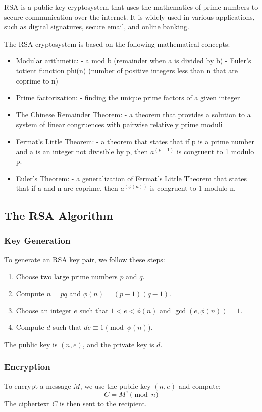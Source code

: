\documentclass[12pt,openany]{book}
\theoremstyle{definition}
\begin{document}
	RSA is a public-key cryptosystem that uses the mathematics of prime numbers to secure communication over the internet. It is widely used in various applications, such as digital signatures, secure email, and online banking.
	
	The RSA cryptosystem is based on the following mathematical concepts:
	
	
	\begin{itemize}
		\item Modular arithmetic:
		- a mod b (remainder when a is divided by b)
		- Euler's totient function phi(n) (number of positive integers less than n that are coprime to n)
		\item Prime factorization:
		- finding the unique prime factors of a given integer
		\item The Chinese Remainder Theorem:
		- a theorem that provides a solution to a system of linear congruences with pairwise relatively prime moduli
		\item Fermat's Little Theorem:
		- a theorem that states that if p is a prime number and a is an integer not divisible by p, then $a^{(p-1)}$ is congruent to 1 modulo p.
		\item Euler's Theorem:
		- a generalization of Fermat's Little Theorem that states that if a and n are coprime, then $a^{(\phi(n))}$ is congruent to 1 modulo n.
	\end{itemize}
	
	\subsection{The RSA Algorithm}
	
	\subsubsection{Key Generation}
	To generate an RSA key pair, we follow these steps:
	\begin{enumerate}
		\item Choose two large prime numbers $p$ and $q$.
		\item Compute $n = pq$ and $\phi(n) = (p-1)(q-1)$.
		\item Choose an integer $e$ such that $1 < e < \phi(n)$ and $\gcd(e, \phi(n)) = 1$.
		\item Compute $d$ such that $de \equiv 1 \pmod{\phi(n)}$.
	\end{enumerate}
	The public key is $(n, e)$, and the private key is $d$.
	
	\subsubsection{Encryption}
	To encrypt a message $M$, we use the public key $(n, e)$ and compute:
	$$C = M^e \pmod{n}$$
	The ciphertext $C$ is then sent to the recipient.
	
\end{document}
